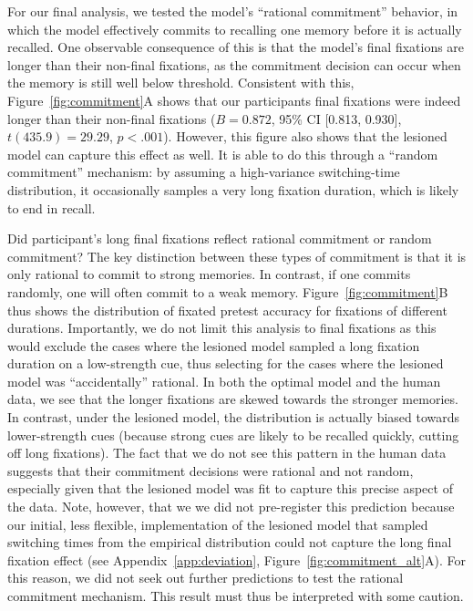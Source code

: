 For our final analysis, we tested the model's ``rational commitment'' behavior, in which the model effectively commits to recalling one memory before it is actually recalled. One observable consequence of this is that the model's final fixations are longer than their non-final fixations, as the commitment decision can occur when the memory is still well below threshold. Consistent with this, Figure~\ref{fig:commitment}A shows that our participants final fixations were indeed longer than their non-final fixations ($B = 0.872$, 95\% CI [0.813, 0.930], $t(435.9)=29.29$, $p < .001$). However, this figure also shows that the lesioned model can capture this effect as well. It is able to do this through a ``random commitment'' mechanism: by assuming a high-variance switching-time distribution, it occasionally samples a very long fixation duration, which is likely to end in recall. 

Did participant's long final fixations reflect rational commitment or random commitment? The key distinction between these types of commitment is that it is only rational to commit to strong memories. In contrast, if one commits randomly, one will often commit to a weak memory. Figure~\ref{fig:commitment}B thus shows the distribution of fixated pretest accuracy for fixations of different durations. Importantly, we do not limit this analysis to final fixations as this would exclude the cases where the lesioned model sampled a long fixation duration on a low-strength cue, thus selecting for the cases where the lesioned model was ``accidentally'' rational. In both the optimal model and the human data, we see that the longer fixations are skewed towards the stronger memories. In contrast, under the lesioned model, the distribution is actually biased towards lower-strength cues (because strong cues are likely to be recalled quickly, cutting off long fixations). The fact that we do not see this pattern in the human data suggests that their commitment decisions were rational and not random, especially given that the lesioned model was fit to capture this precise aspect of the data. Note, however, that we we did not pre-register this prediction because our initial, less flexible, implementation of the lesioned model that sampled switching times from the empirical distribution could not capture the long final fixation effect (see Appendix~\ref{app:deviation}, Figure~\ref{fig:commitment_alt}A). For this reason, we did not seek out further predictions to test the rational commitment mechanism. This result must thus be interpreted with some caution.

